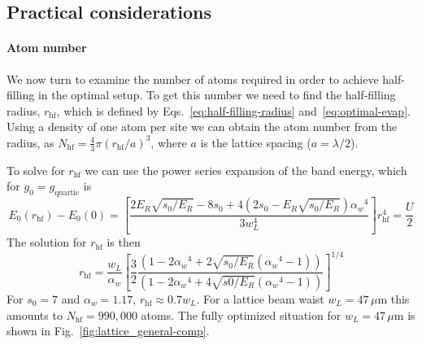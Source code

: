 \documentclass[11pt,letter]{article}
\newcommand{\awaist}{\ensuremath{ \alpha_{w} }}
\begin{document}
\subsection{Practical considerations} 

\paragraph{Atom number} We now turn to examine the number of atoms required in
order to achieve half-filling in the optimal setup.   To get this number we
need to find the half-filling radius, $r_{\text{hf}}$,  which is defined by
Eqs.~\ref{eq:half-filling-radius} and~\ref{eq:optimal-evap}.  Using a density
of one atom per site we can obtain the atom number from the radius, as
$N_{\text{hf}} = \frac{4}{3} \pi (r_{\text{hf}}/a)^{3}$,  where $a$ is the
lattice spacing ($a=\lambda/2$). 

To solve for $r_{\text{hf}}$ we can use
the power series expansion of the band energy, which for
$g_{0}=g_{\text{quartic}}$ is 
\begin{equation}
  E_{0}(r_{\text{hf}}) - E_{0}(0) = \left[  
  \frac{  2E_{R}\sqrt{s_{0}/E_{R}} - 8s_{0} 
   + 4( 2s_{0} -E_{R}\sqrt{s_{0}/E_{R}} ) \awaist^{4} }
  { 3 w_{L}^{4} } \right] r_{\text{hf}}^{4} =  \frac{U}{2}  
\end{equation}
The solution for $r_{\text{hf}}$ is then 
\begin{equation}
  r_{\text{hf}} =  \frac{w_{L}}{\awaist} \left[ 
  \frac{3}{2}  
  \frac{( 1 - 2\awaist^{4} + 2 \sqrt{s_{0}/E_{R}}( \awaist^{4} -1 ) )}
  { ( 1 -  2\awaist^{4} + 4 \sqrt{s0/E_{R}} ( \awaist^{4} -1 ) ) } 
  \right]^{1/4} 
\end{equation}
For $s_{0}=7$ and $\awaist=1.17$,  $r_{\text{hf}}\approx 0.7 w_{L}$.
For a lattice beam waist $w_{L}=47\,\mu$m  this amounts to
$N_{\text{hf}}=990,000$ atoms.    The fully optimized situation for
$w_{L}=47\,\mu$m is shown in Fig.~\ref{fig:lattice_general-comp}. 
 

% 
\end{document}
